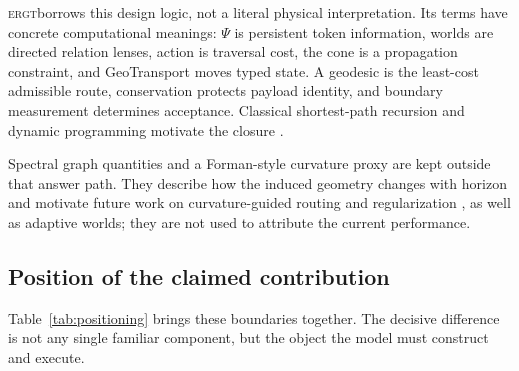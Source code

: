 \documentclass[11pt]{article}
\newcommand{\ERGT}{\textsc{ergt}}
\begin{document}
\ERGT borrows this design logic, not a literal physical interpretation. Its
terms have concrete computational meanings: $\Psi$ is persistent token
information, worlds are directed relation lenses, action is traversal cost,
the cone is a propagation constraint, and GeoTransport moves typed state. A
geodesic is the least-cost admissible route, conservation protects payload
identity, and boundary measurement determines acceptance. Classical
shortest-path recursion and dynamic programming motivate the closure
\cite{dijkstra1959note,bellman1957dynamic}.

Spectral graph quantities \cite{chung1997spectral} and a Forman-style curvature
proxy \cite{forman2003bochner} are kept outside that answer path. They describe
how the induced geometry changes with horizon and motivate future work on
curvature-guided routing and regularization \cite{topping2022understanding}, as
well as adaptive worlds; they are not used to attribute the current
performance.

\subsection{Position of the claimed contribution}

Table~\ref{tab:positioning} brings these boundaries together. The decisive
difference is not any single familiar component, but the object the model must
construct and execute.
\end{document}
